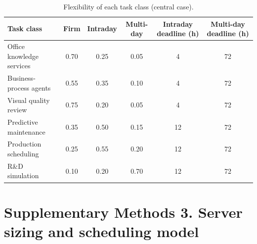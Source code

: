 \documentclass[11pt]{article}
\begin{document}
\begin{table}[H]
\centering\small
\caption{Flexibility of each task class (central case).}\label{tab:flex}
\begin{tabular}{@{}lccccc@{}}
\toprule
Task class & Firm & Intraday & Multi-day & Intraday deadline (h) & Multi-day deadline (h) \\
\midrule
Office knowledge services & 0.70 & 0.25 & 0.05 & 4 & 72 \\
Business-process agents & 0.55 & 0.35 & 0.10 & 4 & 72 \\
Visual quality review & 0.75 & 0.20 & 0.05 & 4 & 72 \\
Predictive maintenance & 0.35 & 0.50 & 0.15 & 12 & 72 \\
Production scheduling & 0.25 & 0.55 & 0.20 & 12 & 72 \\
R\&D simulation & 0.10 & 0.20 & 0.70 & 12 & 72 \\
\bottomrule
\end{tabular}
\end{table}

\clearpage
\section*{Supplementary Methods 3. Server sizing and scheduling model}
\end{document}
